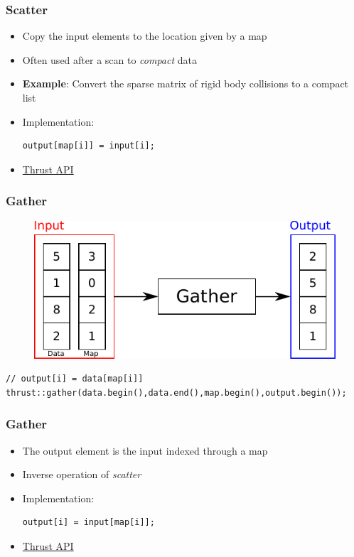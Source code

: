 \documentclass[aspectratio=169,handout]{beamer}
\begin{document}
\begin{frame}[fragile]
\frametitle{Scatter}
	\begin{itemize}
	\item Copy the input elements to the location given by a map
	\item<2-> Often used after a scan to \textit{compact} data
	\item<2-> \textbf{Example}: Convert the sparse matrix of rigid body collisions to a compact list
	\item<3-> Implementation:

\begin{lstlisting}
output[map[i]] = input[i];
\end{lstlisting}
	\item<3-> \href{https://thrust.github.io/doc/group__scattering.html}{Thrust API}
\end{itemize} 	
\end{frame}

\begin{frame}[fragile]
\frametitle{Gather}
\begin{figure}
	\centering
	\includegraphics[height=0.6\textheight]{o_gather}
\end{figure}

\begin{lstlisting}
// output[i] = data[map[i]]
thrust::gather(data.begin(),data.end(),map.begin(),output.begin());
\end{lstlisting}
\end{frame}

\begin{frame}[fragile]
\frametitle{Gather}
\begin{itemize}
	\item The output element is the input indexed through a map
	\item<2-> Inverse operation of \textit{scatter}
	\item<3-> Implementation:


\begin{lstlisting}
output[i] = input[map[i]];
\end{lstlisting}
		\item<3-> \href{https://thrust.github.io/doc/group__gathering.html}{Thrust API}
\end{itemize} 
\end{frame}
\end{document}
